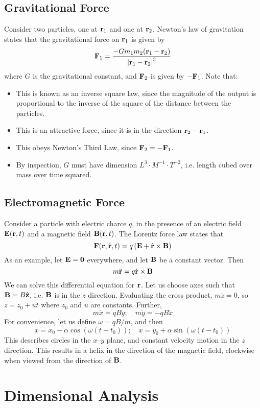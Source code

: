 \documentclass{article}
\begin{document}
\subsection{Gravitational Force}
Consider two particles, one at $\vb r_1$ and one at $\vb r_2$. Newton's law of gravitation states that the gravitational force on $\vb r_1$ is given by
\[ \vb F_1 = \frac{- G m_1 m_2 (\vb r_1 - \vb r_2)}{\abs{\vb r_1 - \vb r_2}^3} \]
where $G$ is the gravitational constant, and $\vb F_2$ is given by $-\vb F_1$. Note that:
\begin{itemize}
	\item This is known as an inverse square law, since the magnitude of the output is proportional to the inverse of the square of the distance between the particles.
	\item This is an attractive force, since it is in the direction $\vb r_2 - \vb r_1$.
	\item This obeys Newton's Third Law, since $\vb F_2 = - \vb F_1$.
	\item By inspection, $G$ must have dimension $L^3 \cdot M^{-1} \cdot T^{-2}$, i.e. length cubed over mass over time squared.
\end{itemize}

\subsection{Electromagnetic Force}
Consider a particle with electric charce $q$, in the presence of an electric field $\vb E(\vb r, t)$ and a magnetic field $\vb B(\vb r, t)$. The Lorentz force law states that
\[ \vb F(\vb r, \dot{\vb r}, t) = q\left( \vb E + \dot{\vb r} \times \vb B \right) \]
As an example, let $\vb E = \vb 0$ everywhere, and let $\vb B$ be a constant vector. Then
\[ m \ddot{\vb r} = q \dot{\vb r} \times \vb B \]
We can solve this differential equation for $\vb r$. Let us choose axes such that $\vb B = B \vu{z}$, i.e. $\vb B$ is in the $z$ direction. Evaluating the cross product, $m \ddot{z} = 0$, so $z = z_0 + ut$ where $z_0$ and $u$ are constants. Further,
\[ m \ddot x = qB\dot y;\quad m \ddot y = -qB\dot x \]
For convenience, let us define $\omega = qB/m$, and then
\[ x = x_0 - \alpha \cos(\omega(t - t_0));\quad x = y_0 + \alpha \sin(\omega(t - t_0)) \]
This describes circles in the $x$--$y$ plane, and constant velocity motion in the $z$ direction. This results in a helix in the direction of the magnetic field, clockwise when viewed from the direction of $\vb B$.

\section{Dimensional Analysis}
\end{document}
